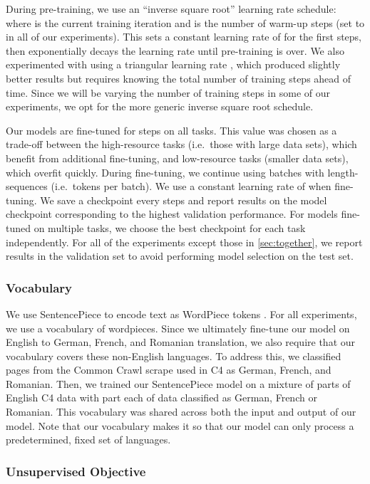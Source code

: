 \documentclass[twoside,11pt]{article}
\begin{document}
During pre-training, we use an ``inverse square root'' learning rate schedule:  where  is the current training iteration and  is the number of warm-up steps (set to  in all of our experiments).
This sets a constant learning rate of  for the first  steps, then exponentially decays the learning rate until pre-training is over.
We also experimented with using a triangular learning rate \citep{howard2018universal}, which produced slightly better results but requires knowing the total number of training steps ahead of time.
Since we will be varying the number of training steps in some of our experiments, we opt for the more generic inverse square root schedule.

Our models are fine-tuned for  steps on all tasks.
This value was chosen as a trade-off between the high-resource tasks (i.e.\ those with large data sets), which benefit from additional fine-tuning, and low-resource tasks (smaller data sets), which overfit quickly.
During fine-tuning, we continue using batches with  length- sequences (i.e.\  tokens per batch).
We use a constant learning rate of  when fine-tuning.
We save a checkpoint every  steps and report results on the model checkpoint corresponding to the highest validation performance.
For models fine-tuned on multiple tasks, we choose the best checkpoint for each task independently.
For all of the experiments except those in \cref{sec:together}, we report results in the validation set to avoid performing model selection on the test set.

\subsubsection{Vocabulary}
We use SentencePiece \citep{kudo2018sentencepiece} to encode text as WordPiece tokens \citep{sennrich2015neural,kudo2018subword}.
For all experiments, we use a vocabulary of  wordpieces.
Since we ultimately fine-tune our model on English to German, French, and Romanian translation, we also require that our vocabulary covers these non-English languages.
To address this, we classified pages from the Common Crawl scrape used in C4 as German, French, and Romanian.
Then, we trained our SentencePiece model on a mixture of  parts of English C4 data with  part each of data classified as German, French or Romanian.
This vocabulary was shared across both the input and output of our model.
Note that our vocabulary makes it so that our model can only process a predetermined, fixed set of languages.

\subsubsection{Unsupervised Objective}
\label{sec:baseline_objective}
\end{document}
